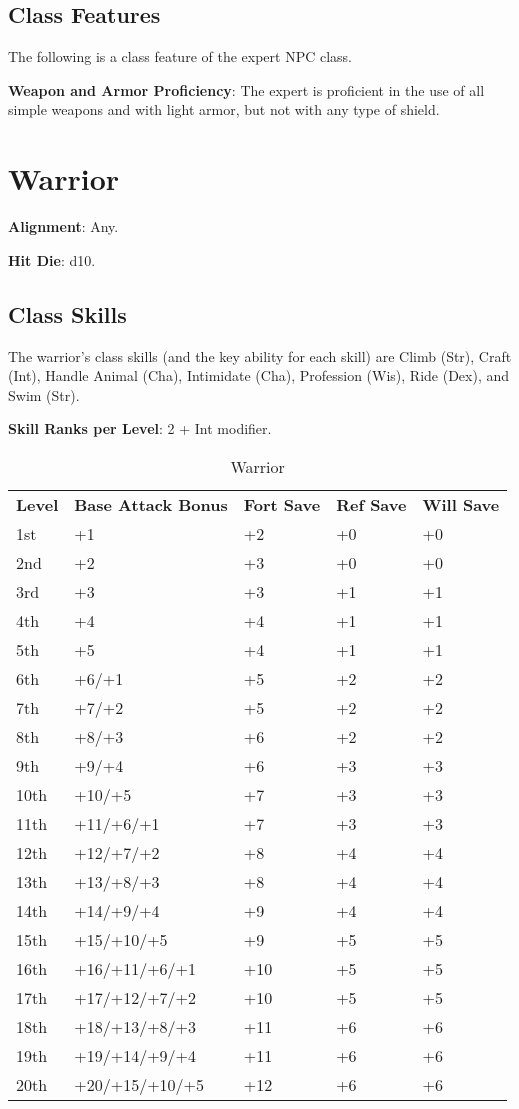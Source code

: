\subsection{Class Features}

				
The following is a class feature of the expert NPC class.
				
\textbf{Weapon and Armor Proficiency}: The expert is proficient in the use of all simple weapons and with light armor, but not with any type of shield. 
				
\section{Warrior}

				
\textbf{Alignment}: Any.
				
\textbf{Hit Die}: d10.
				
\subsection{Class Skills}

				
The warrior's class skills (and the key ability for each skill) are Climb (Str), Craft (Int), Handle Animal (Cha), Intimidate (Cha), Profession (Wis), Ride (Dex), and Swim (Str).
				
\textbf{Skill Ranks per Level}: 2 + Int modifier.
	
\begin{table}[]
\sffamily
\caption{Warrior}
\begin{tabular}{lllll}
\textbf{Level} & \textbf{Base Attack Bonus} & \textbf{Fort Save} & \textbf{Ref Save} & \textbf{Will Save} \\
1st & +1 & +2 & +0 & +0\\
2nd & +2 & +3 & +0 & +0\\
3rd & +3 & +3 & +1 & +1\\
4th & +4 & +4 & +1 & +1\\
5th & +5 & +4 & +1 & +1\\
6th & +6/+1 & +5 & +2 & +2\\
7th & +7/+2 & +5 & +2 & +2\\
8th & +8/+3 & +6 & +2 & +2\\
9th & +9/+4 & +6 & +3 & +3\\
10th & +10/+5 & +7 & +3 & +3\\
11th & +11/+6/+1 & +7 & +3 & +3\\
12th & +12/+7/+2 & +8 & +4 & +4\\
13th & +13/+8/+3 & +8 & +4 & +4\\
14th & +14/+9/+4 & +9 & +4 & +4\\
15th & +15/+10/+5 & +9 & +5 & +5\\
16th & +16/+11/+6/+1 & +10 & +5 & +5\\
17th & +17/+12/+7/+2 & +10 & +5 & +5\\
18th & +18/+13/+8/+3 & +11 & +6 & +6\\
19th & +19/+14/+9/+4 & +11 & +6 & +6\\
20th & +20/+15/+10/+5 & +12 & +6 & +6\\
\end{tabular}
\end{table}

